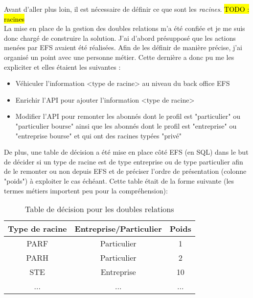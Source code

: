 	Avant d'aller plus loin, il est nécessaire de définir ce que sont les \textit{racines}. \hl{TODO : racines} \\
	
	La mise en place de la gestion des doubles relations m'a été confiée et je me suis donc chargé de construire la solution. J'ai d'abord présupposé que les actions menées par EFS avaient été réalisées. Afin de les définir de manière précise, j'ai organisé un point avec une personne métier. Cette dernière a donc pu me les expliciter et elles étaient les suivantes :
	\begin{itemize}
		\item Véhiculer l’information <type de racine> au niveau du back office EFS
		\item Enrichir l’API pour ajouter l’information <type de racine>
		\item Modifier l’API pour remonter les abonnés dont le profil est "particulier" ou "particulier bourse" ainsi que les abonnés dont le profil est "entreprise" ou "entreprise bourse" et qui ont des racines typées "privé" \\
	\end{itemize}
	
	De plus, une table de décision a été mise en place côté EFS (en SQL) dans le but de décider si un type de racine est de type entreprise ou de type particulier afin de le remonter ou non depuis EFS et de préciser l’ordre de présentation (colonne "poids") à exploiter le cas échéant. Cette table était de la forme suivante (les termes métiers importent peu pour la compréhension): \\
	
\begin{table}[h!]
	\center
	\begin{tabular}{| c | c | c |}
     \hline
     Type de racine & Entreprise/Particulier & Poids \\ \hline
     PARF & Particulier & 1\\ \hline
     PARH & Particulier & 2\\ \hline
     STE & Entreprise & 10\\ \hline
     ... & ... & ...\\
     \hline
	\end{tabular}
	\caption{Table de décision pour les doubles relations}
	\label{tableDecisionRacine}
\end{table}
	
